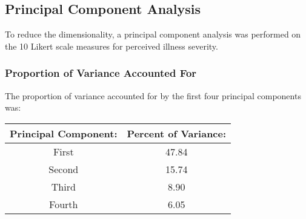 \documentclass[12pt]{article}
\begin{document}
\subsection*{Principal Component Analysis}
To reduce the dimensionality, a principal component analysis was performed on the 10 Likert scale measures for perceived illness severity.
\par\vspace{0.3 cm}
\subsubsection*{Proportion of Variance Accounted For}
The proportion of variance accounted for by the first four principal components was:
\par\vspace{0.3 cm}
\begin{tabular}{cc} Principal Component: & Percent of Variance:\\
\hline
First  & 47.84\\
Second & 15.74\\
Third  &  8.90\\
Fourth &  6.05
\end{tabular}
\par\vspace{0.3 cm}
\end{document}

